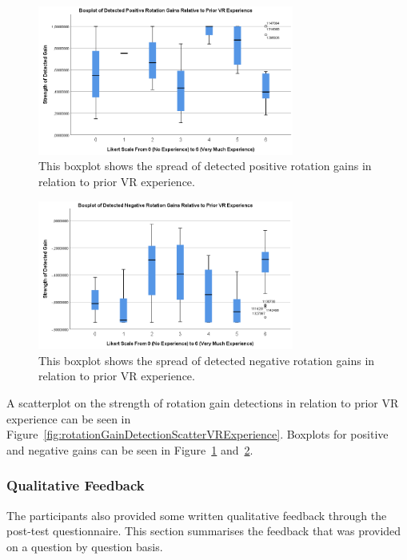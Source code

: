 \begin{figure}[tbph]
    \centering
    \includegraphics[width=0.75\textwidth]{figures/graphs/PosRotDetectionsByVRExperience.png}
    \caption[Boxplot on Detected Positive Rotation Gains by VR Experience]{This boxplot shows the spread of detected positive rotation gains in relation to prior VR experience.}
    \label{fig:posRotDetectionBoxplotVRExperience}
\end{figure}

\begin{figure}[tbph]
    \centering
    \includegraphics[width=0.75\textwidth]{figures/graphs/NegRotDetectionsByVRExperience.png}
    \caption[Boxplot on Detected Negative Rotation Gains by VR Experience]{This boxplot shows the spread of detected negative rotation gains in relation to prior VR experience.}
    \label{fig:negRotDetectionBoxplotVRExperience}
\end{figure}

A scatterplot on the strength of rotation gain detections in relation to prior VR experience can be seen in Figure~\ref{fig:rotationGainDetectionScatterVRExperience}. Boxplots for positive and negative gains can be seen in Figure~\ref{fig:posRotDetectionBoxplotVRExperience} and~\ref{fig:negRotDetectionBoxplotVRExperience}.


\subsubsection{Qualitative Feedback}
The participants also provided some written qualitative feedback through the post-test questionnaire. This section summarises the feedback that was provided on a question by question basis. 

